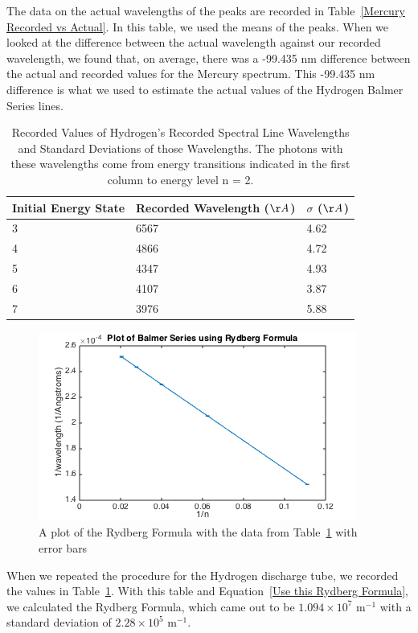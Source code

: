 The data on the actual wavelengths of the peaks are recorded in Table~\ref{Mercury Recorded vs Actual}. In this table, we used the means of the peaks. When we looked at the difference between the actual wavelength against our recorded wavelength, we found that, on average, there was a -99.435 nm difference between the actual and recorded values for the Mercury spectrum. This -99.435 nm difference is what we used to estimate the actual values of the Hydrogen Balmer Series lines. 

\begin{table}[h]
\begin{tabular}{|l|l|l|}
\hline
Initial Energy State & Recorded Wavelength ($\AA$) & $\sigma$ ($\AA$)\\ \hline
3 & 6567                & 4.62               \\
4 & 4866                & 4.72               \\
5 & 4347                & 4.93               \\
6 & 4107                & 3.87               \\
7 & 3976                & 5.88               \\ \hline
\end{tabular}
\caption{Recorded Values of Hydrogen's Recorded Spectral Line Wavelengths and Standard Deviations of those Wavelengths. The photons with these wavelengths come from energy transitions indicated in the first column to energy level n = 2.}
\label{Hydrogen Recorded}
\end{table}

\begin{figure}[t]
  \includegraphics[width = 8 cm]{Rydberg.png}
  \begin{center}
  \caption{A plot of the Rydberg Formula with the data from Table~\ref{Hydrogen Recorded} with error bars}
  \label{Rydberg Plot}
  \end{center}
\end{figure}

When we repeated the procedure for the Hydrogen discharge tube, we recorded the values in Table~\ref{Hydrogen Recorded}. With this table and Equation~\ref{Use this Rydberg Formula}, we calculated the Rydberg Formula, which came out to be $1.094 \times 10^{7}$ m$^{-1}$ with a standard deviation of $2.28 \times 10^{5} $ m$^{-1}$.  

